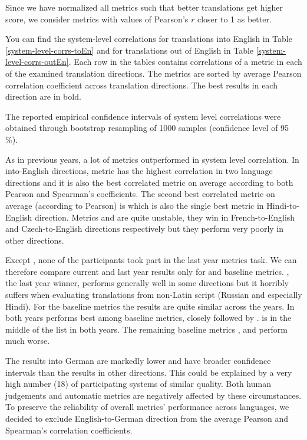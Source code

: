 Since we have normalized all metrics such that better translations get higher
score, we consider metrics with values of Pearson's $r$ closer to 1 as better. 

You can find the system-level correlations for translations into English in
Table \ref{system-level-corrs-toEn} and for translations out of English in
Table \ref{system-level-corrs-outEn}. Each row in the tables contains
correlations of a metric in each of the examined translation directions. The
metrics are sorted by average Pearson correlation coefficient across
translation directions. The best results in each direction are in bold.

The reported empirical confidence intervals of system level correlations were
obtained through
bootstrap resampling of 1000
samples (confidence level of 95\,\%).

As in previous years, a lot of metrics outperformed  in system
level correlation. In into-English directions, metric
 has the highest correlation in two language
directions and it is also the best correlated metric on average according to both
Pearson and Spearman's coefficients. The second best correlated metric on
average (according to Pearson) is  which is also the single
best metric in Hindi-to-English direction.  Metrics  and
 are quite unstable, they win in French-to-English and
Czech-to-English directions respectively but they perform very poorly in other
directions. 

Except , none of the participants took part in the last year
metrics task.  We can therefore compare current and last year results only for
 and baseline metrics.  , the last year winner,
performs generally well in some directions but it horribly suffers when
evaluating translations from non-Latin script (Russian and especially Hindi).
For the baseline metrics the results are quite similar across the years. In
both years  performs best among baseline metrics, closely followed
by .  is in the middle of the list in both
years. The remaining baseline metrics , 
and  perform much worse.

The results into German are markedly lower and have broader confidence
intervals than the results in other directions. This could be explained by a
very
high number (18) of participating systems of similar quality. 
Both human judgements and automatic metrics are negatively affected by these
circumstances. To preserve the reliability of overall metrics' performance
across languages, we
decided to exclude English-to-German
direction from the average Pearson and Spearman's correlation coefficients.

